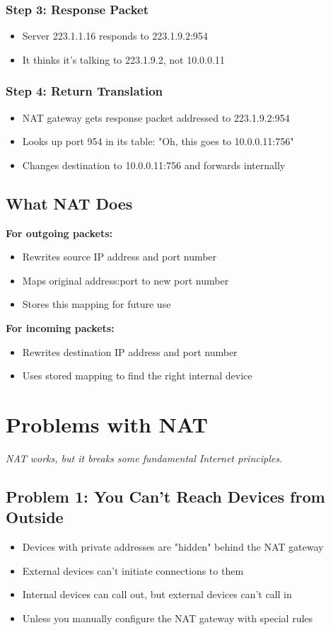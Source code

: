 \documentclass[../../compsys.tex]{subfiles}
\begin{document}
\subsubsection{Step 3: Response Packet}
\begin{itemize}
    \item Server 223.1.1.16 responds to 223.1.9.2:954
    \item It thinks it's talking to 223.1.9.2, not 10.0.0.11
\end{itemize}

\subsubsection{Step 4: Return Translation}
\begin{itemize}
    \item NAT gateway gets response packet addressed to 223.1.9.2:954
    \item Looks up port 954 in its table: "Oh, this goes to 10.0.0.11:756"
    \item Changes destination to 10.0.0.11:756 and forwards internally
\end{itemize}

\subsection{What NAT Does}
\textbf{For outgoing packets:}
\begin{itemize}
    \item Rewrites source IP address and port number
    \item Maps original address:port to new port number
    \item Stores this mapping for future use
\end{itemize}

\textbf{For incoming packets:}
\begin{itemize}
    \item Rewrites destination IP address and port number
    \item Uses stored mapping to find the right internal device
\end{itemize}

\section{Problems with NAT}
\textit{NAT works, but it breaks some fundamental Internet principles.}

\subsection{Problem 1: You Can't Reach Devices from Outside}
\begin{itemize}
    \item Devices with private addresses are "hidden" behind the NAT gateway
    \item External devices can't initiate connections to them
    \item Internal devices can call out, but external devices can't call in
    \item Unless you manually configure the NAT gateway with special rules
\end{itemize}
\end{document}
